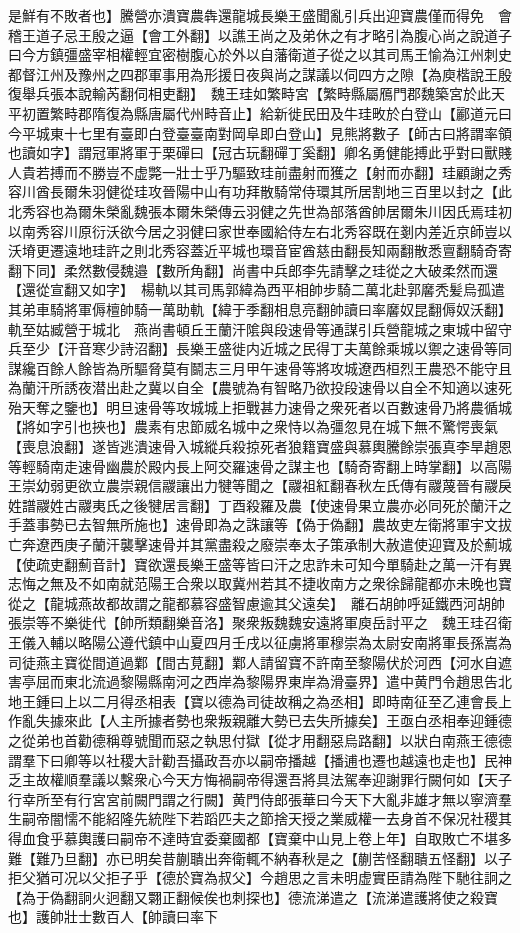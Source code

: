 是鮮有不敗者也】騰營亦潰寶農犇還龍城長樂王盛聞亂引兵出迎寶農僅而得免　會稽王道子忌王殷之逼【會工外翻】以譙王尚之及弟休之有才略引為腹心尚之說道子曰今方鎮彊盛宰相權輕宜密樹腹心於外以自藩衛道子從之以其司馬王愉為江州刺史都督江州及豫州之四郡軍事用為形援日夜與尚之謀議以伺四方之隙【為庾楷說王殷復舉兵張本說輸芮翻伺相吏翻】　魏王珪如繁畤宮【繁畤縣屬鴈門郡魏築宮於此天平初置繁畤郡隋復為縣唐屬代州畤音止】給新徙民田及牛珪畋於白登山【酈道元曰今平城東十七里有臺即白登臺臺南對岡阜即白登山】見熊將數子【師古曰將謂率領也讀如字】謂冠軍將軍于栗磾曰【冠古玩翻磾丁奚翻】卿名勇健能搏此乎對曰獸賤人貴若搏而不勝豈不虚斃一壯士乎乃驅致珪前盡射而獲之【射而亦翻】珪顧謝之秀容川酋長爾朱羽健從珪攻晉陽中山有功拜散騎常侍環其所居割地三百里以封之【此北秀容也為爾朱榮亂魏張本爾朱榮傳云羽健之先世為部落酋帥居爾朱川因氏焉珪初以南秀容川原衍沃欲今居之羽健曰家世奉國給侍左右北秀容既在剗内差近京師豈以沃塉更遷遠地珪許之則北秀容蓋近平城也環音宦酋慈由翻長知兩翻散悉亶翻騎奇寄翻下同】柔然數侵魏邉【數所角翻】尚書中兵郎李先請擊之珪從之大破柔然而還【還從宣翻又如字】　楊軌以其司馬郭緯為西平相帥步騎二萬北赴郭黁秃髪烏孤遣其弟車騎將軍傉檀帥騎一萬助軌【緯于季翻相息亮翻帥讀曰率黁奴昆翻傉奴沃翻】軌至姑臧營于城北　燕尚書頓丘王蘭汗隂與段速骨等通謀引兵營龍城之東城中留守兵至少【汗音寒少詩沼翻】長樂王盛徙内近城之民得丁夫萬餘乘城以禦之速骨等同謀纔百餘人餘皆為所驅脅莫有鬬志三月甲午速骨等將攻城遼西桓烈王農恐不能守且為蘭汗所誘夜潜出赴之冀以自全【農號為有智略乃欲投段速骨以自全不知適以速死殆天奪之鑒也】明旦速骨等攻城城上拒戰甚力速骨之衆死者以百數速骨乃將農循城【將如字引也挾也】農素有忠節威名城中之衆恃以為彊忽見在城下無不驚愕喪氣【喪息浪翻】遂皆逃潰速骨入城縱兵殺掠死者狼籍寶盛與慕輿騰餘崇張真李旱趙恩等輕騎南走速骨幽農於殿内長上阿交羅速骨之謀主也【騎奇寄翻上時掌翻】以高陽王崇幼弱更欲立農崇親信鬷讓出力犍等聞之【鬷祖紅翻春秋左氏傳有鬷蔑晉有鬷戾姓譜鬷姓古鬷夷氏之後犍居言翻】丁酉殺羅及農【使速骨果立農亦必同死於蘭汗之手蓋事勢已去智無所施也】速骨即為之誅讓等【偽于偽翻】農故吏左衛將軍宇文拔亡奔遼西庚子蘭汗襲擊速骨并其黨盡殺之廢崇奉太子策承制大赦遣使迎寶及於薊城【使疏吏翻薊音計】寶欲還長樂王盛等皆曰汗之忠詐未可知今單騎赴之萬一汗有異志悔之無及不如南就范陽王合衆以取冀州若其不捷收南方之衆徐歸龍都亦未晚也寶從之【龍城燕故都故謂之龍都慕容盛智慮逾其父遠矣】　離石胡帥呼延鐵西河胡帥張崇等不樂徙代【帥所類翻樂音洛】聚衆叛魏魏安遠將軍庾岳討平之　魏王珪召衛王儀入輔以略陽公遵代鎮中山夏四月壬戌以征虜將軍穆崇為太尉安南將軍長孫嵩為司徒燕主寶從間道過鄴【間古莧翻】鄴人請留寶不許南至黎陽伏於河西【河水自遮害亭屈而東北流過黎陽縣南河之西岸為黎陽界東岸為滑臺界】遣中黄門令趙思告北地王鍾曰上以二月得丞相表【寶以德為司徒故稱之為丞相】即時南征至乙連會長上作亂失據來此【人主所據者勢也衆叛親離大勢已去失所據矣】王亟白丞相奉迎鍾德之從弟也首勸德稱尊號聞而惡之執思付獄【從才用翻惡烏路翻】以狀白南燕王德德謂羣下曰卿等以社稷大計勸吾攝政吾亦以嗣帝播越【播逋也遷也越遠也走也】民神乏主故權順羣議以繫衆心今天方悔禍嗣帝得還吾將具法駕奉迎謝罪行闕何如【天子行幸所至有行宮宮前闕門謂之行闕】黄門侍郎張華曰今天下大亂非雄才無以寧濟羣生嗣帝闇懦不能紹隆先統陛下若蹈匹夫之節捨天授之業威權一去身首不保况社稷其得血食乎慕輿護曰嗣帝不達時宜委棄國都【寶棄中山見上卷上年】自取敗亡不堪多難【難乃旦翻】亦已明矣昔蒯聵出奔衛輒不納春秋是之【蒯苦怪翻聵五怪翻】以子拒父猶可况以父拒子乎【德於寶為叔父】今趙思之言未明虚實臣請為陛下馳往詗之【為于偽翻詗火迥翻又翾正翻候俟也刺探也】德流涕遣之【流涕遣護將使之殺寶也】護帥壯士數百人【帥讀曰率下